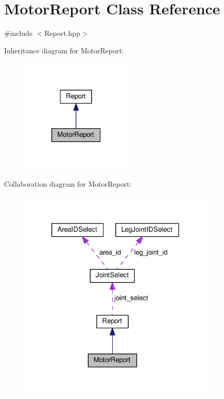 \hypertarget{classMotorReport}{}\section{Motor\+Report Class Reference}
\label{classMotorReport}


{\ttfamily \#include $<$Report.\+hpp$>$}



Inheritance diagram for Motor\+Report\+:\nopagebreak
\begin{figure}[H]
\begin{center}
\leavevmode
\includegraphics[width=151pt]{classMotorReport__inherit__graph}
\end{center}
\end{figure}


Collaboration diagram for Motor\+Report\+:\nopagebreak
\begin{figure}[H]
\begin{center}
\leavevmode
\includegraphics[width=266pt]{classMotorReport__coll__graph}
\end{center}
\end{figure}
